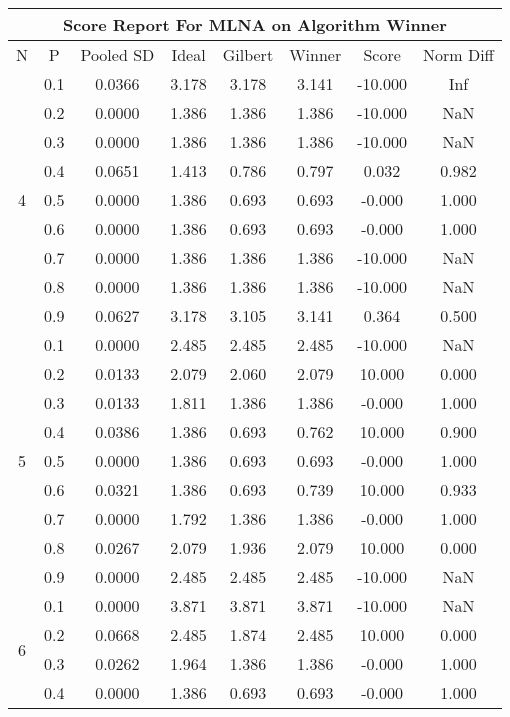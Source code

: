 \documentclass[11pt,a4paper]{report}
\begin{document}
\begin{longtable}{ | c | c || c | c | c | c | c | c | }
\hline
\multicolumn{8}{|c|}{ Score Report For MLNA on Algorithm Winner} \\
\hline
N & P & Pooled SD &  Ideal &  Gilbert & Winner  & Score & Norm Diff \\
 \hline
 \hline
 \endhead
\multirow{9}{*}{4} & 0.1 & 0.0366 & 3.178 & 3.178 & 3.141 & -10.000 & Inf \\
 & 0.2 & 0.0000 & 1.386 & 1.386 & 1.386 & -10.000 & NaN \\
 & 0.3 & 0.0000 & 1.386 & 1.386 & 1.386 & -10.000 & NaN \\
 & 0.4 & 0.0651 & 1.413 & 0.786 & 0.797 & 0.032 & 0.982 \\
 & 0.5 & 0.0000 & 1.386 & 0.693 & 0.693 & -0.000 & 1.000 \\
 & 0.6 & 0.0000 & 1.386 & 0.693 & 0.693 & -0.000 & 1.000 \\
 & 0.7 & 0.0000 & 1.386 & 1.386 & 1.386 & -10.000 & NaN \\
 & 0.8 & 0.0000 & 1.386 & 1.386 & 1.386 & -10.000 & NaN \\
 & 0.9 & 0.0627 & 3.178 & 3.105 & 3.141 & 0.364 & 0.500 \\
 \hline
\multirow{9}{*}{5} & 0.1 & 0.0000 & 2.485 & 2.485 & 2.485 & -10.000 & NaN \\
 & 0.2 & 0.0133 & 2.079 & 2.060 & 2.079 & 10.000 & 0.000 \\
 & 0.3 & 0.0133 & 1.811 & 1.386 & 1.386 & -0.000 & 1.000 \\
 & 0.4 & 0.0386 & 1.386 & 0.693 & 0.762 & 10.000 & 0.900 \\
 & 0.5 & 0.0000 & 1.386 & 0.693 & 0.693 & -0.000 & 1.000 \\
 & 0.6 & 0.0321 & 1.386 & 0.693 & 0.739 & 10.000 & 0.933 \\
 & 0.7 & 0.0000 & 1.792 & 1.386 & 1.386 & -0.000 & 1.000 \\
 & 0.8 & 0.0267 & 2.079 & 1.936 & 2.079 & 10.000 & 0.000 \\
 & 0.9 & 0.0000 & 2.485 & 2.485 & 2.485 & -10.000 & NaN \\
 \hline
\multirow{9}{*}{6} & 0.1 & 0.0000 & 3.871 & 3.871 & 3.871 & -10.000 & NaN \\
 & 0.2 & 0.0668 & 2.485 & 1.874 & 2.485 & 10.000 & 0.000 \\
 & 0.3 & 0.0262 & 1.964 & 1.386 & 1.386 & -0.000 & 1.000 \\
 & 0.4 & 0.0000 & 1.386 & 0.693 & 0.693 & -0.000 & 1.000 \\

\end{longtable}
\end{document}
